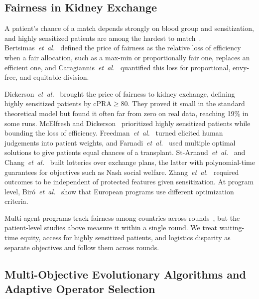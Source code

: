 \documentclass[journal]{IEEEtran}
\begin{document}
\subsection{Fairness in Kidney Exchange}
\label{sec:related:fairness}

A patient's chance of a match depends strongly on blood group and
sensitization, and highly sensitized patients are among the hardest to
match~\cite{ANZKX2021}.
Bertsimas~\textit{et~al.}~\cite{bertsimas2011price} defined the price of
fairness as the relative loss of efficiency when a fair allocation, such
as a max-min or proportionally fair one, replaces an efficient one, and
Caragiannis~\textit{et~al.}~\cite{caragiannis2012efficiency} quantified
this loss for proportional, envy-free, and equitable division.

Dickerson~\textit{et~al.}~\cite{dickerson2014price} brought the price of
fairness to kidney exchange, defining highly sensitized patients by
$\text{cPRA} \geq 80$.
They proved it small in the standard theoretical model but found it
often far from zero on real data, reaching 19\% in some runs.
McElfresh and Dickerson~\cite{mcelfresh2018balancing} prioritized highly
sensitized patients while bounding the loss of efficiency.
Freedman~\textit{et~al.}~\cite{freedman2020adapting} turned elicited
human judgements into patient weights, and
Farnadi~\textit{et~al.}~\cite{farnadi2021individual} used multiple
optimal solutions to give patients equal chances of a transplant.
St-Arnaud~\textit{et~al.}~\cite{starnaud2025adaptation} and
Chang~\textit{et~al.}~\cite{chang2025optimizing} built lotteries over
exchange plans, the latter with polynomial-time guarantees for
objectives such as Nash social welfare.
Zhang~\textit{et~al.}~\cite{zhang2026fairness} required outcomes to be
independent of protected features given sensitization.
At program level, Bir\'{o}~\textit{et~al.}~\cite{biro2021modelling}
show that European programs use different optimization criteria.

Multi-agent programs track fairness among countries across
rounds~\cite{klimentova2021fairness}, but the patient-level studies
above measure it within a single round.
We treat waiting-time equity, access for highly sensitized patients,
and logistics disparity as separate objectives and follow them across
rounds.

\subsection{Multi-Objective Evolutionary Algorithms and Adaptive
Operator Selection}
\label{sec:related:moea}
\end{document}
